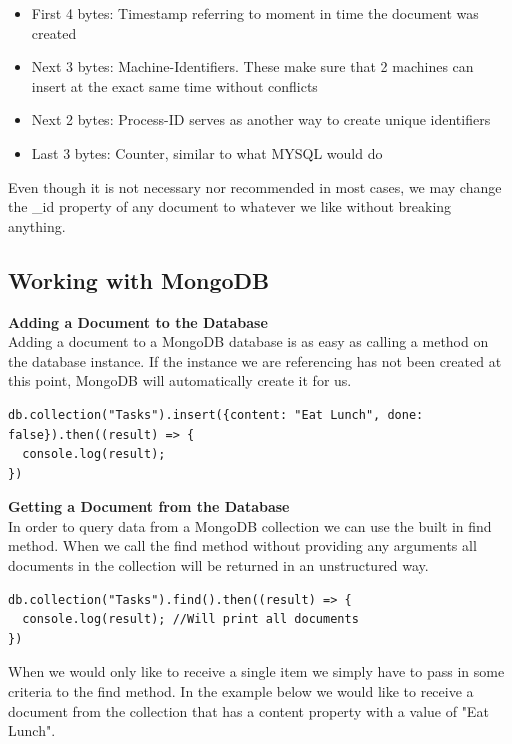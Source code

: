 \documentclass[11pt]{article}
\begin{document}
\begin{itemize}
	\item First 4 bytes: Timestamp referring to moment in time the document was created
	\item Next 3 bytes: Machine-Identifiers. These make sure that 2 machines can insert at the exact same time without conflicts
	\item Next 2 bytes: Process-ID serves as another way to create unique identifiers
	\item Last 3 bytes: Counter, similar to what MYSQL would do
\end{itemize} 

Even though it is not necessary nor recommended in most cases, we may change the \_id property of any document to whatever we like without breaking anything. 






\subsection{Working with MongoDB}

\noindent
\textbf{Adding a  Document to the Database} \\  
Adding a document to a MongoDB database is as easy as calling a method on the database instance. If the instance we are referencing has not been created at this point, MongoDB will automatically create it for us.  

\begin{lstlisting}
db.collection("Tasks").insert({content: "Eat Lunch", done: false}).then((result) => {
  console.log(result);
})
\end{lstlisting}

\noindent
\textbf{Getting a  Document from the Database} \\  
In order to query data from a MongoDB collection we can use the built in find method. When we call the find method without providing any arguments all documents in the collection will be returned in an unstructured way. 
 
\begin{lstlisting}
db.collection("Tasks").find().then((result) => {
  console.log(result); //Will print all documents
})
\end{lstlisting}

When we would only like to receive a single item we simply have to pass in some criteria to the find method. In the example below we would like to receive a document from the collection that has a content property with a value of "Eat Lunch". 
\end{document}
